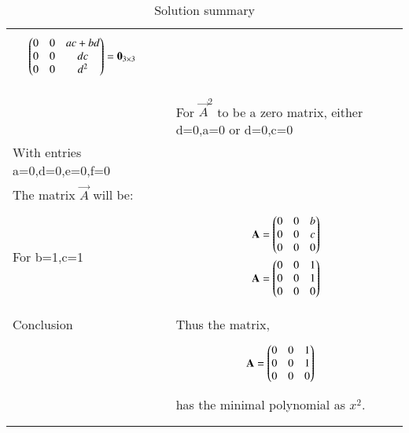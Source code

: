 \documentclass[journal,12pt]{IEEEtran}
\begin{document}
\begin{longtable}{|l|l|}
{\begin{align*}
    \begin{pmatrix}0&0&ac+bd\\0&0&dc\\0&0&d^2\end{pmatrix}&=\mathbf{0}_{3\times3}
\end{align*}}\\
&\\
\hline
\pagebreak
\hline
&\\
&For $\vec{A}^2$ to be a zero matrix, either d=0,a=0 or d=0,c=0\\
With entries a=0,d=0,e=0,f=0&\\
The matrix $\vec{A}$ will be:&\\
For b=1,c=1&\parbox{6cm}{\begin{align*}
    \mathbf{A}&=\begin{pmatrix}0&0&b\\0&0&c\\0&0&0\end{pmatrix}\\
    \mathbf{A}&=\begin{pmatrix}0&0&1\\0&0&1\\0&0&0\end{pmatrix}
\end{align*}}\\
\hline
&\\
Conclusion&Thus the matrix,\\
&\parbox{6cm}{\begin{align*}
        \mathbf{A}&=\begin{pmatrix}0&0&1\\0&0&1\\0&0&0\end{pmatrix}
\end{align*}}\\
&has the minimal polynomial as $x^2$.\\
&\\
\hline
\caption{Solution summary}
\label{table:2}
\end{longtable}
\end{document}
